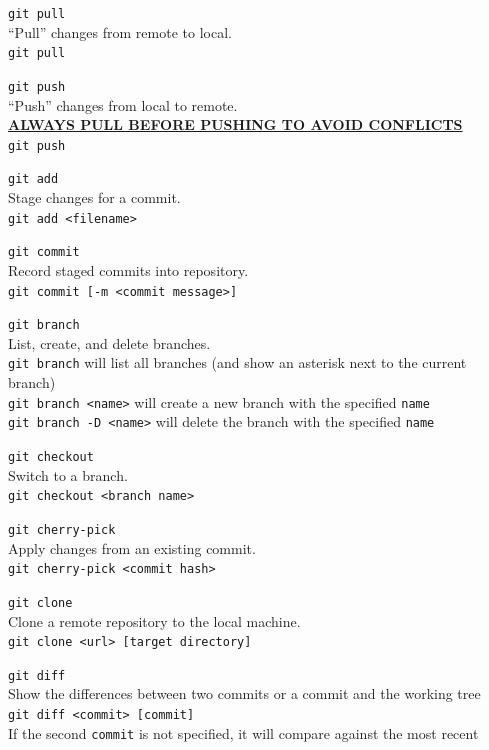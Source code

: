 \documentclass{article}
\begin{document}
\begin{description}
	\item \texttt{git pull}
		\\``Pull'' changes from remote to local.
		\\\texttt{git pull}
	\item \texttt{git push}
		\\``Push'' changes from local to remote.
		\\\underline{\textbf{ALWAYS PULL BEFORE PUSHING TO AVOID CONFLICTS}}
		\\\texttt{git push}
	\item \texttt{git add}
		\\Stage changes for a commit.
		\\\texttt{git add <filename>}
	\item \texttt{git commit}
		\\Record staged commits into repository.
		\\\texttt{git commit [-m <commit message>]}
	\item \texttt{git branch}
		\\List, create, and delete branches.
		\\\texttt{git branch} will list all branches (and show an asterisk next to the current branch)
		\\\texttt{git branch <name>} will create a new branch with the specified \texttt{name}
		\\\texttt{git branch -D <name>} will delete the branch with the specified \texttt{name}
	\item \texttt{git checkout}
		\\Switch to a branch.
		\\\texttt{git checkout <branch name>}
	\item \texttt{git cherry-pick}
		\\Apply changes from an existing commit.
		\\\texttt{git cherry-pick <commit hash>}
	\item \texttt{git clone}
		\\Clone a remote repository to the local machine.
		\\\texttt{git clone <url> [target directory]}
	\item \texttt{git diff}
		\\Show the differences between two commits or a commit and the working tree
		\\\texttt{git diff <commit> [commit]}
		\\If the second \texttt{commit} is not specified, it will compare against the most recent

\end{description}
\end{document}
